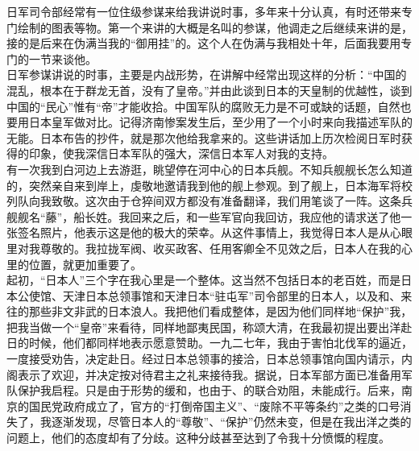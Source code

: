 日军司令部经常有一位住级参谋来给我讲说时事，多年来十分认真，有时还带来专门绘制的图表等物。第一个来讲的大概是名叫的参谋，他调走之后继续来讲的是，接的是后来在伪满当我的“御用挂”的。这个人在伪满与我相处十年，后面我要用专门的一节来谈他。\\

日军参谋讲说的时事，主要是内战形势，在讲解中经常出现这样的分析：“中国的混乱，根本在于群龙无首，没有了皇帝。”并由此谈到日本的天皇制的优越性，谈到中国的“民心”惟有“帝”才能收拾。中国军队的腐败无力是不可或缺的话题，自然也要用日本皇军做对比。记得济南惨案发生后，至少用了一个小时来向我描述军队的无能。日本布告的抄件，就是那次他给我拿来的。这些讲话加上历次检阅日军时获得的印象，使我深信日本军队的强大，深信日本军人对我的支持。\\

有一次我到白河边上去游逛，眺望停在河中心的日本兵舰。不知兵舰舰长怎么知道的，突然亲自来到岸上，虔敬地邀请我到他的舰上参观。到了舰上，日本海军将校列队向我致敬。这次由于仓猝间双方都没有准备翻译，我们用笔谈了一阵。这条兵舰舰名“藤”，船长姓。我回来之后，和一些军官向我回访，我应他的请求送了他一张签名照片，他表示这是他的极大的荣幸。从这件事情上，我觉得日本人是从心眼里对我尊敬的。我拉拢军阀、收买政客、任用客卿全不见效之后，日本人在我的心里的位置，就更加重要了。\\

起初，“日本人”三个字在我心里是一个整体。这当然不包括日本的老百姓，而是日本公使馆、天津日本总领事馆和天津日本“驻屯军”司令部里的日本人，以及和、来往的那些非文非武的日本浪人。我把他们看成整体，是因为他们同样地“保护”我，把我当做一个“皇帝”来看待，同样地鄙夷民国，称颂大清，在我最初提出要出洋赴日的时候，他们都同样地表示愿意赞助。一九二七年，我由于害怕北伐军的逼近，一度接受劝告，决定赴日。经过日本总领事的接洽，日本总领事馆向国内请示，内阁表示了欢迎，并决定按对待君主之礼来接待我。据说，日本军部方面已准备用军队保护我启程。只是由于形势的缓和，也由于、的联合劝阻，未能成行。后来，南京的国民党政府成立了，官方的“打倒帝国主义”、“废除不平等条约”之类的口号消失了，我逐渐发现，尽管日本人的“尊敬”、“保护”仍然未变，但是在我出洋之类的问题上，他们的态度却有了分歧。这种分歧甚至达到了令我十分愤慨的程度。\\

